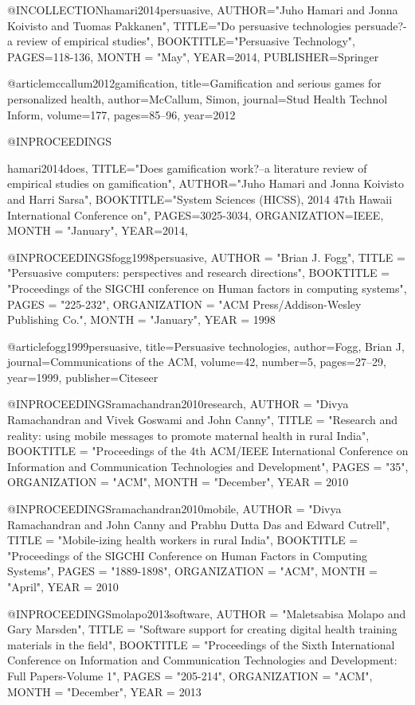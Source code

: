 @INCOLLECTION{hamari2014persuasive,
  AUTHOR="Juho Hamari and Jonna Koivisto and Tuomas Pakkanen",
  TITLE="Do persuasive technologies persuade?-a review of empirical studies",
  BOOKTITLE="Persuasive Technology",
  PAGES={118-136},
  MONTH = "May",
  YEAR={2014},
  PUBLISHER={Springer}
}

@article{mccallum2012gamification,
  title={Gamification and serious games for personalized health},
  author={McCallum, Simon},
  journal={Stud Health Technol Inform},
  volume={177},
  pages={85--96},
  year={2012}
}


@INPROCEEDINGS{hamari2014does,
  TITLE="Does gamification work?--a literature review of empirical studies on gamification",
  AUTHOR="Juho Hamari and Jonna Koivisto and Harri Sarsa",
  BOOKTITLE="System Sciences (HICSS), 2014 47th Hawaii International Conference on",
  PAGES={3025-3034},
  ORGANIZATION={IEEE},
  MONTH = "January",
  YEAR={2014},

}

@INPROCEEDINGS{fogg1998persuasive,
	AUTHOR = "Brian J. Fogg",
	TITLE = "Persuasive computers: perspectives and research directions",
	BOOKTITLE = "Proceedings of the SIGCHI conference on Human factors in computing systems",
	PAGES = "225-232",
	ORGANIZATION = "ACM Press/Addison-Wesley Publishing Co.",
	MONTH = "January", 
	YEAR = {1998}	}
	
	
@article{fogg1999persuasive,
  title={Persuasive technologies},
  author={Fogg, Brian J},
  journal={Communications of the ACM},
  volume={42},
  number={5},
  pages={27--29},
  year={1999},
  publisher={Citeseer}
}


@INPROCEEDINGS{ramachandran2010research,
	AUTHOR = "Divya Ramachandran and Vivek Goswami and John Canny",
	TITLE = "Research and reality: using mobile messages to promote maternal health in rural India",
	BOOKTITLE = "Proceedings of the 4th ACM/IEEE International Conference on Information and Communication Technologies and Development",
	PAGES = "35",
	ORGANIZATION = "ACM",
	MONTH = "December", 
	YEAR = {2010}	}

@INPROCEEDINGS{ramachandran2010mobile,
	AUTHOR = "Divya Ramachandran and John Canny and Prabhu Dutta Das and Edward Cutrell",
	TITLE = "Mobile-izing health workers in rural India",
	BOOKTITLE = "Proceedings of the SIGCHI Conference on Human Factors in Computing Systems",
	PAGES = "1889-1898",
	ORGANIZATION = "ACM",
	MONTH = "April", 
	YEAR = {2010}	}

@INPROCEEDINGS{molapo2013software,
	AUTHOR = "Maletsabisa Molapo and Gary Marsden",
	TITLE = "Software support for creating digital health training materials in the field",
	BOOKTITLE = "Proceedings of the Sixth International Conference on Information and Communication Technologies and Development: Full Papers-Volume 1",
	PAGES = "205-214",
	ORGANIZATION = "ACM",
	MONTH = "December", 
	YEAR = {2013}	}

